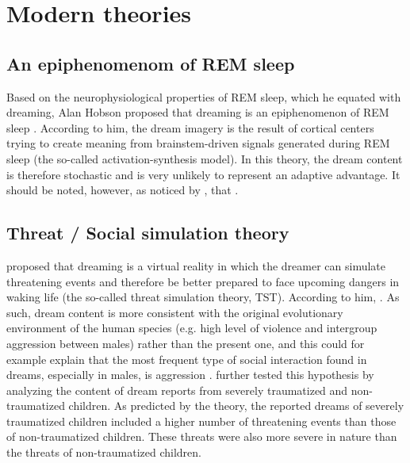 \section{Modern theories}
\label{sec:dream-func:modern}

\subsection{An epiphenomenom of REM sleep}
\label{sec:dream-func:modern:nofunc}

Based on the neurophysiological properties of REM sleep, which he equated with dreaming, Alan Hobson proposed that dreaming is an epiphenomenon of REM sleep \citep{hobson_dream_1998}. According to him, the dream imagery is the result of cortical centers trying to create meaning from brainstem-driven signals generated during REM sleep (the so-called activation-synthesis model). In this theory, the dream content is therefore stochastic and is very unlikely to represent an adaptive advantage. It should be noted, however, as noticed by \citet{windt_dreaming:_2015}, that .

\subsection{Threat / Social simulation theory}
\label{sec:dream-func:modern:revonsuo}

\citet{revonsuo_reinterpretation_2000} proposed that dreaming is a virtual reality in which the dreamer can simulate threatening events and therefore be better prepared to face upcoming dangers in waking life (the so-called threat simulation theory, TST). According to him,  \citep{valli_threat_2005}. As such, dream content is more consistent with the original evolutionary environment of the human species (e.g. high level of violence and intergroup aggression between males) rather than the present one, and this could for example explain that the most frequent type of social interaction found in dreams, especially in males, is aggression \citep{hall_content_1966}. \citet{valli_threat_2005} further tested this hypothesis by analyzing the content of dream reports from severely traumatized and non-traumatized children. As predicted by the theory, the reported dreams of severely traumatized children included a higher number of threatening events than those of non-traumatized children. These threats were also more severe in nature than the threats of non-traumatized children.

